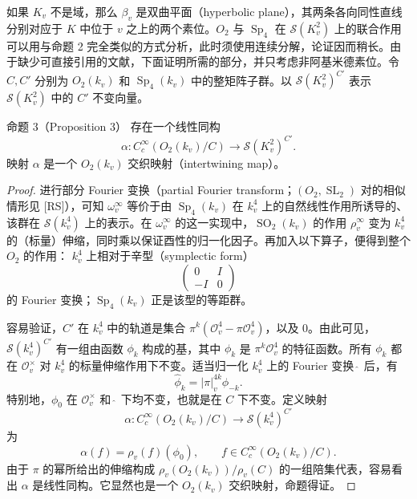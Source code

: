 如果 $K_v$ 不是域，那么 $\beta_v$ 是双曲平面（hyperbolic plane），其两条各向同性直线分别对应于 $K$ 中位于 $v$ 之上的两个素位。$O_2$ 与 $\operatorname{Sp}_4$ 在 $\mathcal S(K_v^2)$ 上的联合作用可以用与命题 2 完全类似的方式分析，此时须使用连续分解，论证因而稍长。由于缺少可直接引用的文献，下面证明所需的部分，并只考虑非阿基米德素位。令 $C,C'$ 分别为 $O_2(k_v)$ 和 $\operatorname{Sp}_4(k_v)$ 中的整矩阵子群。以 $\mathcal S(K_v^2)^{C'}$ 表示 $\mathcal S(K_v^2)$ 中的 $C'$ 不变向量。

\begin{originaltheorem}{命题 3（Proposition 3）}
存在一个线性同构
\[
 \alpha:C_c^\infty(O_2(k_v)/C)\longrightarrow\mathcal S(K_v^2)^{C'}.
\]
映射 $\alpha$ 是一个 $O_2(k_v)$ 交织映射（intertwining map）。
\end{originaltheorem}
\begin{proof}
进行部分 Fourier 变换（partial Fourier transform；$(O_2,\operatorname{SL}_2)$ 对的相似情形见 [RS]），可知 $\omega_v^\infty$ 等价于由 $\operatorname{Sp}_4(k_v)$ 在 $k_v^4$ 上的自然线性作用所诱导的、该群在 $\mathcal S(k_v^4)$ 上的表示。在 $\omega_v^\infty$ 的这一实现中，$\operatorname{SO}_2(k_v)$ 的作用 $\rho_v^\infty$ 变为 $k_v^4$ 的（标量）伸缩，同时乘以保证酉性的归一化因子。再加入以下算子，便得到整个 $O_2$ 的作用： $k_v^4$ 上相对于辛型（symplectic form）
\[
 \begin{pmatrix}0&I\\-I&0\end{pmatrix}
\]
的 Fourier 变换；$\operatorname{Sp}_4(k_v)$ 正是该型的等距群。

容易验证，$C'$ 在 $k_v^4$ 中的轨道是集合 $\pi^k(\mathcal O_v^4-\pi\mathcal O_v^4)$，以及 $0$。由此可见，$\mathcal S(k_v^4)^{C'}$ 有一组由函数 $\phi_k$ 构成的基，其中 $\phi_k$ 是 $\pi^k\mathcal O_v^4$ 的特征函数。所有 $\phi_k$ 都在 $\mathcal O_v^\times$ 对 $k_v^4$ 的标量伸缩作用下不变。适当归一化 $k_v^4$ 上的 Fourier 变换 $\widehat{\ }$ 后，有
\begin{equation}
 \widehat\phi_k=|\pi|_v^{4k}\phi_{-k}.\tag{2.10}
\end{equation}
特别地，$\phi_0$ 在 $\mathcal O_v^\times$ 和 $\widehat{\ }$ 下均不变，也就是在 $C$ 下不变。定义映射
\[
 \alpha:C_c^\infty(O_2(k_v)/C)\longrightarrow\mathcal S(k_v^4)^{C'}
\]
为
\[
 \alpha(f)=\rho_v(f)(\phi_0),\qquad f\in C_c^\infty(O_2(k_v)/C).
\]
由于 $\pi$ 的幂所给出的伸缩构成 $\rho_v(O_2(k_v))/\rho_v(C)$ 的一组陪集代表，容易看出 $\alpha$ 是线性同构。它显然也是一个 $O_2(k_v)$ 交织映射，命题得证。
\end{proof}

